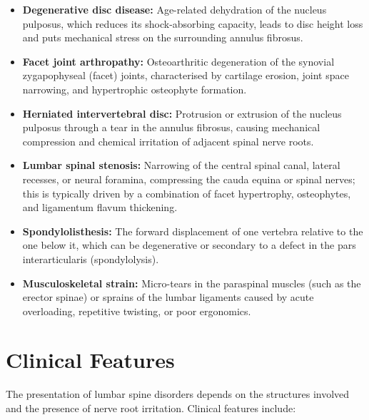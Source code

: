 \begin{itemize}
    \item \textbf{Degenerative disc disease:} Age-related dehydration of the nucleus pulposus, which reduces its shock-absorbing capacity, leads to disc height loss and puts mechanical stress on the surrounding annulus fibrosus.
    \item \textbf{Facet joint arthropathy:} Osteoarthritic degeneration of the synovial zygapophyseal (facet) joints, characterised by cartilage erosion, joint space narrowing, and hypertrophic osteophyte formation.
    \item \textbf{Herniated intervertebral disc:} Protrusion or extrusion of the nucleus pulposus through a tear in the annulus fibrosus, causing mechanical compression and chemical irritation of adjacent spinal nerve roots.
    \item \textbf{Lumbar spinal stenosis:} Narrowing of the central spinal canal, lateral recesses, or neural foramina, compressing the cauda equina or spinal nerves; this is typically driven by a combination of facet hypertrophy, osteophytes, and ligamentum flavum thickening.
    \item \textbf{Spondylolisthesis:} The forward displacement of one vertebra relative to the one below it, which can be degenerative or secondary to a defect in the pars interarticularis (spondylolysis).
    \item \textbf{Musculoskeletal strain:} Micro-tears in the paraspinal muscles (such as the erector spinae) or sprains of the lumbar ligaments caused by acute overloading, repetitive twisting, or poor ergonomics.
\end{itemize}

\section*{Clinical Features}
The presentation of lumbar spine disorders depends on the structures involved and the presence of nerve root irritation. Clinical features include:


